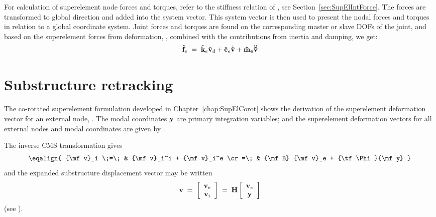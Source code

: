 {For calculation of superelement node forces and torques, refer to the stiffness
relation of , see Section~\ref{sec:SupElIntForce}.
The forces are transformed to global direction and added into the system vector.
This system vector is then used to present the nodal forces and torques in
relation to a global coordinate system.
Joint forces and torques are found on the corresponding master or slave DOFs
of the joint, and based on the superelement forces from deformation,
, combined with the contributions from inertia
and damping, we get:
%
\begin{equation}
\tilde{\bf f}_e \;=\;
\tilde{\bf k}_e \tilde{\bf v}_d +
\tilde{\bf c}_e \dot{\tilde{\bf v}} +
\tilde{\bf m}_e \ddot{\tilde{\bf v}}
\label{eqSR:TotalSupElForce}
\end{equation}

\section{Substructure retracking}

The co-rotated superelement formulation developed in
Chapter~\ref{chap:SupElCorot} shows the derivation of the superelement
deformation vector for an external node, .
The modal coordinates ${\bf y}$ are primary integration variables;
and the superelement deformation vectors for all external nodes and modal
coordinates are given by .

The inverse CMS transformation gives
%
\begin{equation}
\label{eqK43:10}
\eqalign{
{\mf v}_i \;=\; & {\mf v}_i^i + {\mf v}_i^e \cr
            =\; & {\mf B} {\mf v}_e + {\tf \Phi}{\mf y}
}
\end{equation}
%
and the expanded substructure displacement vector may be written
%
\begin{equation}
{\bf v} \;=\;
\left[ \begin{array}{c} {\bf v}_e \\ {\bf v}_i \end{array} \right] \;=\;
{\bf H} \left[ \begin{array}{c} {\bf v}_e \\ {\bf y} \end{array} \right]
\label{eqK43:11}
\end{equation}
%
(see ).

}
